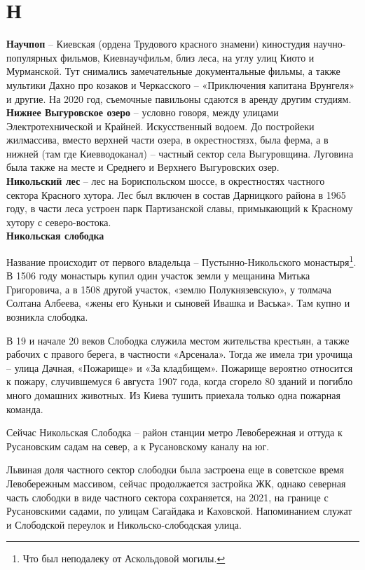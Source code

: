 \chapter*{Н}

\textbf{Научпоп} – Киевская (ордена Трудового красного знамени) киностудия научно-популярных фильмов, Киевнаучфильм, близ леса, на углу улиц Киото и Мурманской. Тут снимались замечательные документальные фильмы, а также мультики Дахно про козаков и Черкасского – «Приключения капитана Врунгеля» и другие. На 2020 год, съемочные павильоны сдаются в аренду другим студиям.\\

\textbf{Нижнее Выгуровское озеро} – условно говоря, между улицами Электротехнической и Крайней. Искусственный водоем. До постройеки жилмассива, вместо верхней части озера, в окрестностязх, была ферма, а в нижней (там где Киевводоканал) – частный сектор села Выгуровщина. Луговина была также на месте и Среднего и Верхнего Выгуровских озер.\\

\textbf{Никольский лес} – лес на Бориспольском шоссе, в окрестностях частного сектора Красного хутора. Лес был включен в состав Дарницкого района в 1965 году, в части леса устроен парк Партизанской славы, примыкающий к Красному хутору с северо-востока.\\

\textbf{Никольская слободка}

Название происходит от первого владельца – Пустынно-Никольского монастыря\footnote{Что был неподалеку от Аскольдовой могилы.}. В 1506 году монастырь купил один участок земли у мещанина Митька Григоровича, а в 1508 другой участок, «землю Полукнязевскую», у толмача Солтана Албеева, «жены его Куньки и сыновей Ивашка и Васька». Там купно и возникла слободка.

 В 19 и начале 20 веков Слободка служила местом жительства крестьян, а также рабочих с правого берега, в частности «Арсенала». Тогда же имела три урочища – улица Дачная, «Пожарище» и «За кладбищем». Пожарище вероятно относится к пожару, случившемуся 6 августа 1907 года, когда сгорело 80 зданий и погибло много домашних животных. Из Киева тушить приехала только одна пожарная команда.

Сейчас Никольская Слободка – район станции метро Левобережная и оттуда к Русановским садам на север, а к Русановскому каналу на юг.

Львиная доля частного сектор слободки была застроена еще в советское время Левобережным массивом, сейчас продолжается застройка ЖК, однако северная часть слободки в виде частного сектора сохраняется, на 2021, на границе с Русановскими садами, по улицам Сагайдака и Каховской. Напоминанием служат и Слободской переулок и Никольско-слободская улица.

